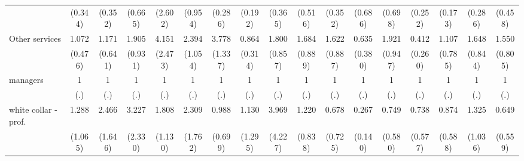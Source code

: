 {\begin{tabular}{l*{16}{c}}
                    &     (0.344)         &     (0.352)         &     (0.665)         &     (2.602)         &     (0.954)         &     (0.286)         &     (0.192)         &     (0.365)         &     (0.516)         &     (0.352)         &     (0.686)         &     (0.698)         &     (0.252)         &     (0.173)         &     (0.286)         &     (0.458)         \\
[1em]
Other services      &       1.072         &       1.171         &       1.905         &       4.151\sym{*}  &       2.394\sym{*}  &       3.778\sym{***}&       0.864         &       1.800         &       1.684         &       1.622         &       0.635         &       1.921         &       0.412         &       1.107         &       1.648         &       1.550         \\
                    &     (0.476)         &     (0.641)         &     (0.931)         &     (2.473)         &     (1.054)         &     (1.337)         &     (0.314)         &     (0.857)         &     (0.889)         &     (0.887)         &     (0.380)         &     (0.947)         &     (0.260)         &     (0.785)         &     (0.844)         &     (0.805)         \\
[1em]
managers            &           1         &           1         &           1         &           1         &           1         &           1         &           1         &           1         &           1         &           1         &           1         &           1         &           1         &           1         &           1         &           1         \\
                    &         (.)         &         (.)         &         (.)         &         (.)         &         (.)         &         (.)         &         (.)         &         (.)         &         (.)         &         (.)         &         (.)         &         (.)         &         (.)         &         (.)         &         (.)         &         (.)         \\
[1em]
white collar - prof.&       1.288         &       2.466         &       3.227         &       1.808         &       2.309         &       0.988         &       1.130         &       3.969         &       1.220         &       0.678         &       0.267\sym{*}  &       0.749         &       0.738         &       0.874         &       1.325         &       0.649         \\
                    &     (1.065)         &     (1.646)         &     (2.330)         &     (1.130)         &     (1.762)         &     (0.699)         &     (1.295)         &     (4.227)         &     (0.838)         &     (0.725)         &     (0.140)         &     (0.580)         &     (0.577)         &     (0.588)         &     (1.036)         &     (0.559)         \\

\end{tabular}}
